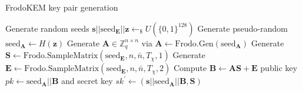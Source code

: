  \begin{algorithm}
\caption{FrodoKEM key pair generation} \label{alg:keygen}
   \begin{flushleft}

   \begin{algorithmic}[1]

    \State Generate random seeds $\mathbf{s} || \text{seed}_\mathbf{E} || \mathbf{z} \leftarrow_\$ U(\{0,1\}^{128})$
        \State Generate pseudo-random $\text{seed}_\mathbf{A} \leftarrow H(\mathbf{z})$
    \State Generate $\mathbf{A} \in \mathbb{Z}^{n \times n}_{q}$ via $\mathbf{A} \leftarrow \text{Frodo.Gen}(\text{seed}_\mathbf{A})$
	\State Generate $\mathbf{S} \leftarrow \text{Frodo.SampleMatrix}(\text{seed}_\mathbf{E},n,\bar{n},T_\chi,1)$
	\State Generate $\mathbf{E} \leftarrow \text{Frodo.SampleMatrix}(\text{seed}_\mathbf{E},n,\bar{n},T_\chi,2)$
	\State Compute $\mathbf{B} \leftarrow \mathbf{AS} + \mathbf{E}$ \label{keygenlwe}
	\State \Return public key $pk \leftarrow \text{seed}_\mathbf{A} || \mathbf{B} $ and secret key $sk^\prime \leftarrow (\mathbf{s} || \text{seed}_\mathbf{A} || \mathbf{B}, \mathbf{S})$
    \EndProcedure
   \end{algorithmic}
    \end{flushleft}

\end{algorithm}

